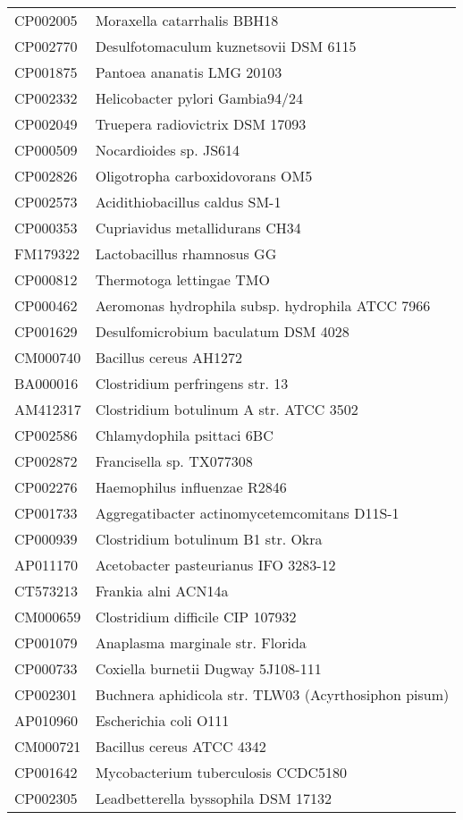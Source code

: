 \begin{longtable}{ll}
CP002005 & Moraxella catarrhalis BBH18\\
CP002770 & Desulfotomaculum kuznetsovii DSM 6115\\
CP001875 & Pantoea ananatis LMG 20103\\
CP002332 & Helicobacter pylori Gambia94/24\\
CP002049 & Truepera radiovictrix DSM 17093\\
CP000509 & Nocardioides sp. JS614\\
CP002826 & Oligotropha carboxidovorans OM5\\
CP002573 & Acidithiobacillus caldus SM-1\\
CP000353 & Cupriavidus metallidurans CH34\\
FM179322 & Lactobacillus rhamnosus GG\\
CP000812 & Thermotoga lettingae TMO\\
CP000462 & Aeromonas hydrophila subsp. hydrophila ATCC 7966\\
CP001629 & Desulfomicrobium baculatum DSM 4028\\
CM000740 & Bacillus cereus AH1272\\
BA000016 & Clostridium perfringens str. 13\\
AM412317 & Clostridium botulinum A str. ATCC 3502\\
CP002586 & Chlamydophila psittaci 6BC\\
CP002872 & Francisella sp. TX077308\\
CP002276 & Haemophilus influenzae R2846\\
CP001733 & Aggregatibacter actinomycetemcomitans D11S-1\\
CP000939 & Clostridium botulinum B1 str. Okra\\
AP011170 & Acetobacter pasteurianus IFO 3283-12\\
CT573213 & Frankia alni ACN14a\\
CM000659 & Clostridium difficile CIP 107932\\
CP001079 & Anaplasma marginale str. Florida\\
CP000733 & Coxiella burnetii Dugway 5J108-111\\
CP002301 & Buchnera aphidicola str. TLW03 (Acyrthosiphon pisum)\\
AP010960 & Escherichia coli O111\\
CM000721 & Bacillus cereus ATCC 4342\\
CP001642 & Mycobacterium tuberculosis CCDC5180\\
CP002305 & Leadbetterella byssophila DSM 17132\\

\end{longtable}
